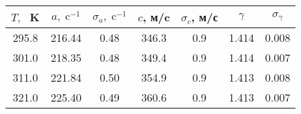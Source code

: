 \begin{tabular}{ccccccc}
\toprule
$T, \;$ K & $a, \; \text{c}^{-1}$ & $\sigma_a, \; \text{c}^{-1}$ & $c$, м/c & $\sigma_c$, м/с & $\gamma$ & $\sigma_{\gamma}$ \\
\midrule
295.8 & 216.44 & 0.48 & 346.3 & 0.9 & 1.414 & 0.008 \\
301.0 & 218.35 & 0.48 & 349.4 & 0.9 & 1.414 & 0.007 \\
311.0 & 221.84 & 0.50 & 354.9 & 0.9 & 1.413 & 0.008 \\
321.0 & 225.40 & 0.49 & 360.6 & 0.9 & 1.413 & 0.007 \\
\bottomrule
\end{tabular}
